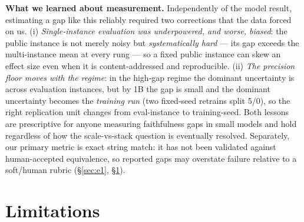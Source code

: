 \documentclass[11pt]{article}
\begin{document}
\textbf{What we learned about measurement.} Independently of the model result, estimating a gap like this reliably required two corrections that the data forced on us. (i) \emph{Single-instance evaluation was underpowered, and worse, biased}: the public instance is not merely noisy but \emph{systematically hard} --- its gap exceeds the multi-instance mean at every rung --- so a fixed public instance can skew an effect size even when it is content-addressed and reproducible. (ii) \emph{The precision floor moves with the regime}: in the high-gap regime the dominant uncertainty is across evaluation instances, but by 1B the gap is small and the dominant uncertainty becomes the \emph{training run} (two fixed-seed retrains split 5/0), so the right replication unit changes from eval-instance to training-seed. Both lessons are prescriptive for anyone measuring faithfulness gaps in small models and hold regardless of how the scale-vs-stack question is eventually resolved. Separately, our primary metric is exact string match: it has not been validated against human-accepted equivalence, so reported gaps may overstate failure relative to a soft/human rubric (\S\ref{sec:e1}, \S\ref{sec:limitations}).

\section{Limitations}\label{sec:limitations}
\end{document}
